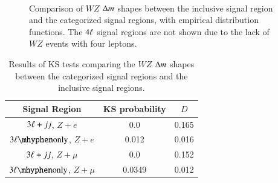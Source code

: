 \begin{figure}[htbp]
{		
	} \\
	\caption{Comparison of $WZ$ $\Delta m$ shapes between the inclusive signal region and the categorized signal regions, with empirical distribution functions. The $4\ell$ signal regions are not shown due to the lack of $WZ$ events with four leptons.}
	\label{fig:inclusive-KS-tests-WZ}
\end{figure}

 \begin{table}[htbp]
	\centering
	\begin{tabular}{ccc}
		Signal Region & KS probability & $D$ \\
		\hline
		$3\ell+jj$, $Z+e$ & 0.0 & 0.165 \\
		$\threelo$, $Z+e$ & 0.012 & 0.016 \\
		$3\ell+jj$, $Z+\mu$ & 0.0 & 0.152 \\
		$\threelo$, $Z+\mu$ & 0.0349 & 0.012
	\end{tabular}
	\caption{Results of KS tests comparing the $WZ$ $\Delta m$ shapes between the categorized signal regions and the inclusive signal regions.}
	\label{table:inclusive-KS-tests-WZ}
\end{table}

